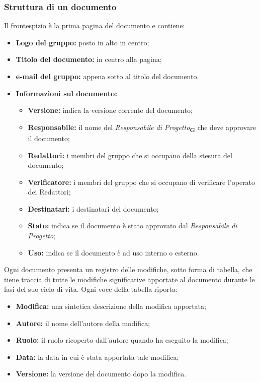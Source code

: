        \subsubsection{Struttura di un documento}
            Il frontespizio è la prima pagina del documento e contiene:
            \begin{itemize}
                \item \textbf{Logo del gruppo:} posto in alto in centro;
                \item \textbf{Titolo del documento:} in centro alla pagina;
                \item \textbf{e-mail del gruppo:} appena sotto al titolo del documento.
                \item \textbf{Informazioni sul documento:}
                    \begin{itemize}
                        \item \textbf{Versione:} indica la versione corrente del documento;
                        \item \textbf{Responsabile:} il nome del \textit{Responsabile di Progetto}\textsubscript{\textbf{G}} che deve approvare il documento;
                        \item \textbf{Redattori:} i membri del gruppo che si occupano della stesura del documento; 
                        \item \textbf{Verificatore:} i membri del gruppo che si occupano di verificare l'operato dei Redattori;
                        \item \textbf{Destinatari:} i destinatari del documento;
                        \item \textbf{Stato:} indica se il documento è stato approvato dal \textit{Responsabile di Progetto};
                        \item \textbf{Uso:} indica se il documento è ad uso interno o esterno.
                    \end{itemize} 
            \end{itemize}
            Ogni documento presenta un registro delle modifiche, sotto forma di tabella, che tiene traccia di tutte le modifiche significative apportate al documento durante le fasi del suo ciclo di vita. Ogni voce della tabella riporta:
            \begin{itemize}
                \item \textbf{Modifica:} una sintetica descrizione della modifica apportata;
                \item \textbf{Autore:} il nome dell’autore della modifica;
                \item \textbf{Ruolo:} il ruolo ricoperto dall’autore quando ha eseguito la modifica;
                \item \textbf{Data:} la data in cui è stata apportata tale modifica;
                \item \textbf{Versione:} la versione del documento dopo la modifica.
            \end{itemize}
